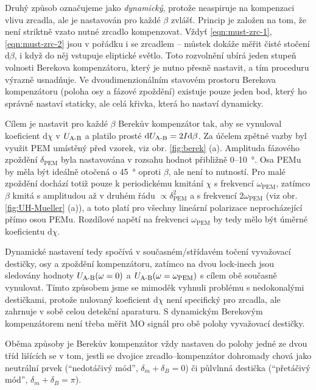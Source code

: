 Druhý způsob označujeme jako \emph{dynamický}, protože neaspiruje na kompenzaci vlivu zrcadla, ale je nastavován pro každé $\beta$ zvlášť.
Princip je založen na tom, že není striktně vzato nutné zrcadlo kompenzovat. Vždyť \eqref{eqn:must-zrc-1}, \eqref{eqn:must-zrc-2} jsou v pořádku i se zrcadlem -- můstek dokáže měřit čisté stočení $\textrm{d}\beta$, i když do něj vstupuje eliptické světlo.
Toto rozvolnění ubírá jeden stupeň volnosti Berekova kompenzátoru, který je nutno přesně nastavit, a tím proceduru výrazně usnadňuje.
Ve dvoudimenzionálním stavovém prostoru Berekova kompenzátoru (poloha osy a fázové zpoždění) existuje pouze jeden bod, který ho správně nastaví staticky, ale celá křivka, která ho nastaví dynamicky.

Cílem je nastavit pro každé $\beta$ Berekův kompenzátor tak, aby se vynuloval koeficient $\textrm{d}\chi$ v $U_\textrm{A-B}$ a platilo prosté $\textrm{d}U_\textrm{A-B}=2I\textrm{d}\beta$.
Za účelem zpětné vazby byl využit PEM umístěný před vzorek, viz obr. \ref{fig:berek} (a).
Amplituda fázového zpoždění $\delta_\textrm{PEM}$ byla nastavována v rozsahu hodnot přibližně 0--\SI{10}{\degree}.
Osa PEMu by měla být ideálně otočená o \SI{45}{\degree} oproti $\beta$, ale není to nutností.
Pro malé zpoždění dochází totiž pouze k periodickému kmitání $\chi$ s frekvencí $\omega_\textrm{PEM}$, zatímco $\beta$ kmitá s amplitudou až v druhém řádu $\propto\delta_\textrm{PEM}^2$ a s frekvencí $2\omega_\textrm{PEM}$ (viz obr. \ref{fig:UH-Mueller} (a)), a toto platí pro všechny lineární polarizace neprocházející přímo osou PEMu.
Rozdílové napětí na frekvenci $\omega_\textrm{PEM}$ by tedy mělo být úměrné koeficientu $\textrm{d}\chi$.

Dynamické nastavení tedy spočívá v současném/střídavém točení vyvažovací destičky, osy a zpoždění kompenzátoru, zatímco na dvou lock-inech jsou sledovány hodnoty $U_\textrm{A-B}(\omega=0)$ a $U_\textrm{A-B}(\omega=\omega_\textrm{PEM})$ s cílem obě současně vynulovat.
Tímto způsobem jsme se mimoděk vyhnuli problému s nedokonalými destičkami, protože nulovaný koeficient $\textrm{d}\chi$ není specifický pro zrcadla, ale zahrnuje v sobě celou detekční aparaturu.
S dynamickým Berekovým kompenzátorem není třeba měřit MO signál pro obě polohy vyvažovací destičky.

Oběma způsoby je Berekův kompenzátor vždy nastaven do polohy jedné ze dvou tříd lišících se v tom, jestli se dvojice zrcadlo--kompenzátor dohromady chová jako neutrální prvek (``nedotáčivý mód'', $\delta_m+\delta_B=0$) či půlvlnná destička (``přetáčivý mód'', $\delta_m+\delta_B=\pi$).

